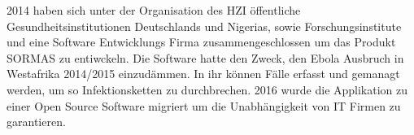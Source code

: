 2014 haben sich unter der Organisation des \ac{HZI} öffentliche Gesundheitsinstitutionen Deutschlands und Nigerias, sowie Forschungsinstitute und eine Software Entwicklungs Firma zusammengeschlossen um das Produkt \ac{SORMAS} zu entiwckeln.
Die Software hatte den Zweck, den Ebola Ausbruch in Westafrika 2014/2015 einzudämmen.
In ihr können Fälle erfasst und gemanagt werden, um so Infektionsketten zu durchbrechen.
2016 wurde die Applikation zu einer Open Source Software migriert um die Unabhängigkeit von IT Firmen zu garantieren.
\cite{SORMAS_history}